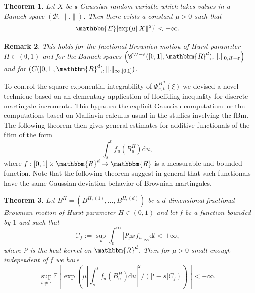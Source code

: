 \documentclass[a4paper,11pt]{article}
\newcommand{\assign}{:=}
\newcommand{\mathd}{\mathrm{d}}
\newcommand{\nocomma}{}
\newtheorem{theorem}{Theorem}[section]
\newtheorem{remark}[theorem]{Remark}
\newcommand{\CC}{\mathscr C}
\begin{document}
\begin{theorem}
  \label{th:fernique}Let $X$ be a Gaussian random variable which takes values in a Banach space $(
  \mathcal{B}, \| . \| )$. Then there exists a constant $\mu >0$ such that
  \[ \mathbbm{E} [ \exp ( \mu \| X \|^{2} ) ] <+ \infty. \]
\end{theorem}

\begin{remark}
  This holds for the fractional Brownian motion of Hurst parameter $H \in (
  0,1 )$ and for the Banach spaces $\left( \CC^{H- \varepsilon} ( [ 0,1 ]
  ,\mathbbm{R}^{d} ) , \| . \|_{0,H- \varepsilon}\right)$ and for $( C ( [ 0,1
  ] \nocomma ,\mathbbm{R}^{d} ) , \| . \|_{\infty , [ 0,1 ]} )$.
\end{remark}

To control the square exponential integrability of $\Phi_{s,t}^{B^{H}} ( \xi
)$ we devised a novel technique based on an elementary application of
Hoeffding inequality for discrete martingale increments. This bypasses the
explicit Gaussian computations or the computations based on Malliavin calculus
usual in the studies involving the fBm. The following theorem then gives
general estimates for additive functionals of the fBm of the form
\[ \int_{s}^{t} f_{u} ( B^{H}_{u} ) \mathd u, \]
where $f: [ 0,1 ] \times \mathbbm{R}^{d} \rightarrow \mathbbm{R}$ is a
measurable and bounded function. Note that the following theorem suggest in
general that such functionals have the same Gaussian deviation behavior of
Brownian martingales.

\begin{theorem}
  \label{th:hoeffding}Let $B^{H} = (B^{H, ( 1 )} , \ldots ,B^{H, ( d )} )$ be a
  $d$-dimensional fractional Brownian motion of Hurst parameter $H \in ( 0,1
  )$ and let $f$ be a function bounded by $1$ and such that
  \[ C_{f} \assign \sup_{u} \int_{0}^{\infty} | P_{t^{2H}} f_{u} |_{\infty}
     \mathd t<+ \infty, \]
  where $P$ is the heat kernel on $\mathbbm{R}^{d}$. Then for $\mu >0$ small
  enough independent of $f$ we have
  \[ \sup_{t \neq s}   \mathbb{E} \left[ \exp   \left( \mu \left\lvert \int_{s}^{t}
     f_{u} ( B^{H}_{u} ) \mathd u \right\lvert^{2} / ( | t-s | C_{f} ) \right)
     \right] <+ \infty . \]
\end{theorem}
\end{document}
